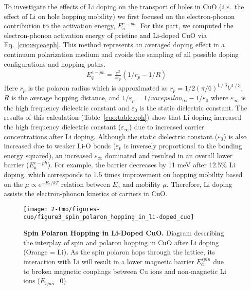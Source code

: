To investigate the effects of Li doping on the transport of holes in CuO (\textit{i.e.}\ the effect of Li on hole hopping mobility) we first focused on the electron-phonon contribution to the activation energy, $E_a^{e-ph}$. For this part, we computed the electron-phonon activation energy of pristine and Li-doped CuO via Eq.~\ref{cuo:eq:eaeph}. This method represents an averaged doping effect in a continuum polarization medium and avoids the sampling of all possible doping configurations and hopping paths.~\cite{austin1969polarons}
\begin{align}
    E_q^{e-ph} = \frac{e^2}{4\varepsilon_p} \left( 1/r_p - 1/R \right)
    \label{cuo:eq:eaeph}
\end{align}
Here $r_p$ is the polaron radius which is approximated as $r_p=1/2 (\pi/6)^{1⁄3} V^{1⁄3}$, $R$ is the average hopping distance, and $1/\varepsilon_p =1/varepsilon_\infty -1/\varepsilon_0$ where $\varepsilon_\infty$ is the high frequency dielectric constant and $\varepsilon_0$ is the static dielectric constant. The results of this calculation (Table~\ref{cuo:table:eph}) show that Li doping increased the high frequency dielectric constant ($\varepsilon_\infty$) due to increased carrier concentrations after Li doping. Although the static dielectric constant ($\varepsilon_0$) is also increased due to weaker Li-O bonds ($\varepsilon_0$ is inversely proportional to the bonding energy squared)\cite{gonze1997dynamical}, an increased $\varepsilon_\infty$ dominated and resulted in an overall lower barrier ($E_a^{e-ph}$). For example, the barrier decreases by 11 meV after 12.5\% Li doping, which corresponds to 1.5 times improvement on hopping mobility based on the $\mu \propto e^{-E_a/kT}$ relation between $E_a$ and mobility $\mu$. Therefore, Li doping assists the electron-phonon kinetics of carriers in CuO.

\begin{figure}
    \centering
    \texttt{[image: 2-tmo/figures-cuo/figure3\_spin\_polaron\_hopping\_in\_li-doped\_cuo]}
    \caption{
    \textbf{Spin Polaron Hopping in Li-Doped CuO.}
    Diagram describing the interplay of spin and polaron hopping in CuO after Li doping (Orange = Li). As the spin polaron hops through the lattice, its interaction with Li will result in a lower magnetic barrier $E_a^{spin}$ due to broken magnetic couplings between Cu ions and non-magnetic Li ions ($E_{spin}$=0).
    }
    \label{cuo:fig:hopli}
\end{figure}

